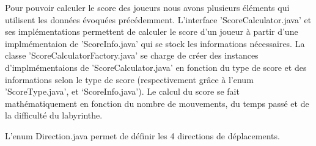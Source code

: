 Pour pouvoir calculer le score des joueurs nous avons plusieurs éléments qui
utilisent les données évoquées précédemment. L'interface 'ScoreCalculator.java'
et ses implémentations permettent de calculer le score d'un joueur à partir
d'une implmémentaion de 'ScoreInfo.java' qui se stock les informations
nécessaires. La classe 'ScoreCalculatorFactory.java' se charge de créer des
instances d'implmémentaions de 'ScoreCalculator.java' en fonction du type de
score et des informations selon le type de score (respectivement grâce à l'enum
'ScoreType.java', et `ScoreInfo.java'). Le calcul du score se fait
mathématiquement en fonction du nombre de mouvements, du temps passé et de la
difficulté du labyrinthe.

L'enum Direction.java permet de définir les 4 directions de déplacements.
